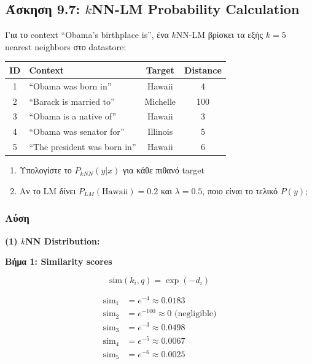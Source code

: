 \subsection{Άσκηση 9.7: $k$NN-LM Probability Calculation}

\begin{formulabox}[Εκφώνηση]
Για το context ``Obama's birthplace is'', ένα $k$NN-LM βρίσκει τα εξής $k=5$
nearest neighbors στο datastore:

\begin{center}
\begin{tabular}{clcc}
\toprule
\textbf{ID} & \textbf{Context} & \textbf{Target} & \textbf{Distance} \\
\midrule
1 & ``Obama was born in'' & Hawaii & 4 \\
2 & ``Barack is married to'' & Michelle & 100 \\
3 & ``Obama is a native of'' & Hawaii & 3 \\
4 & ``Obama was senator for'' & Illinois & 5 \\
5 & ``The president was born in'' & Hawaii & 6 \\
\bottomrule
\end{tabular}
\end{center}

\begin{enumerate}
    \item Υπολογίστε το $P_{kNN}(y | x)$ για κάθε πιθανό target
    \item Αν το LM δίνει $P_{LM}(\text{Hawaii}) = 0.2$ και $\lambda = 0.5$, ποιο είναι το τελικό $P(y)$;
\end{enumerate}
\end{formulabox}

\subsubsection*{Λύση}

\textbf{(1) $k$NN Distribution:}

\textbf{Βήμα 1: Similarity scores}

$$\text{sim}(k_i, q) = \exp(-d_i)$$

\begin{align*}
\text{sim}_1 &= e^{-4} \approx 0.0183 \\
\text{sim}_2 &= e^{-100} \approx 0 \text{ (negligible)} \\
\text{sim}_3 &= e^{-3} \approx 0.0498 \\
\text{sim}_4 &= e^{-5} \approx 0.0067 \\
\text{sim}_5 &= e^{-6} \approx 0.0025
\end{align*}

